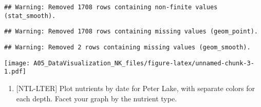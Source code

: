 \documentclass[]{article}
\newenvironment{Shaded}{\begin{snugshade}}{\end{snugshade}}
\newcommand{\KeywordTok}[1]{\textcolor[rgb]{0.13,0.29,0.53}{\textbf{#1}}}
\newcommand{\DataTypeTok}[1]{\textcolor[rgb]{0.13,0.29,0.53}{#1}}
\newcommand{\DecValTok}[1]{\textcolor[rgb]{0.00,0.00,0.81}{#1}}
\newcommand{\StringTok}[1]{\textcolor[rgb]{0.31,0.60,0.02}{#1}}
\newcommand{\CommentTok}[1]{\textcolor[rgb]{0.56,0.35,0.01}{\textit{#1}}}
\newcommand{\OperatorTok}[1]{\textcolor[rgb]{0.81,0.36,0.00}{\textbf{#1}}}
\newcommand{\NormalTok}[1]{#1}
\providecommand{\tightlist}{%
  \setlength{\itemsep}{0pt}\setlength{\parskip}{0pt}}
\begin{document}
\begin{Shaded}
\end{Shaded}

\begin{verbatim}
## Warning: Removed 1708 rows containing non-finite values (stat_smooth).
\end{verbatim}

\begin{verbatim}
## Warning: Removed 1708 rows containing missing values (geom_point).
\end{verbatim}

\begin{verbatim}
## Warning: Removed 2 rows containing missing values (geom_smooth).
\end{verbatim}

\texttt{[image: A05\_DataVisualization\_NK\_files/figure-latex/unnamed-chunk-3-1.pdf]}

\begin{enumerate}
\def\labelenumi{\arabic{enumi}.}
\setcounter{enumi}{4}
\tightlist
\item
  {[}NTL-LTER{]} Plot nutrients by date for Peter Lake, with separate
  colors for each depth. Facet your graph by the nutrient type.
\end{enumerate}
\end{document}
